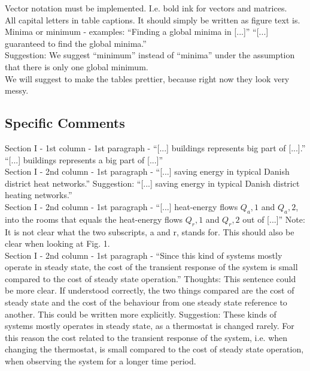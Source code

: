 \noindent Vector notation must be implemented. I.e. bold ink for vectors and matrices.\\

\noindent All capital letters in table captions. It should simply be written as figure text is.\\

\noindent Minima or minimum - examples: “Finding a global minima in [...]” “[...] guaranteed to find the global minima.”\\
Suggestion: We suggest “minimum” instead of “minima” under the assumption that there is only one global minimum. \\

\noindent We will suggest to make the tables prettier, because right now they look very messy.

\subsection{Specific Comments}

\noindent Section I - 1st column - 1st paragraph - “[...] buildings represents big part of [...].”
“[...] buildings represents a big part of [...]”\\


\noindent Section I - 2nd column - 1st paragraph - “[...] saving energy in typical Danish district heat networks.”
Suggestion: “[...] saving energy in typical Danish district heating networks.”\\


\noindent Section I - 2nd column - 1st paragraph - “[...] heat-energy flows $Q_a,1$ and $Q_a,2$, into the rooms that equals the heat-energy flows $Q_r,1$ and $Q_r,2$ out of [...]”
Note: It is not clear what the two subscripts, a and r, stands for. This should also be clear when looking at Fig. 1.\\


\noindent Section I - 2nd column - 1st paragraph - “Since this kind of systems mostly operate in steady state, the cost of the transient response of the system is small compared to the cost of steady state operation.”
Thoughts: This sentence could be more clear. If understood correctly, the two things compared are the cost of steady state and the cost of the behaviour from one steady state reference to another. This could be written more explicitly. 
Suggestion: These kinds of systems mostly operates in steady state, as a thermostat is changed rarely. For this reason the cost related to the transient response of the system, i.e. when changing the thermostat, is small compared to the cost of steady state operation, when observing the system for a longer time period.\\


